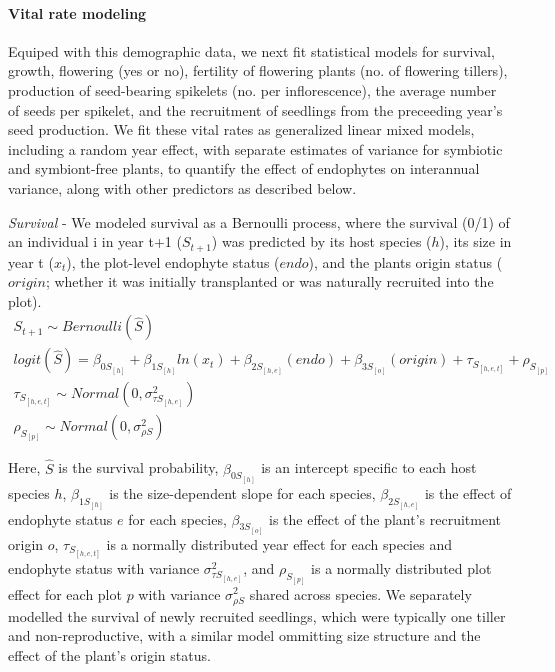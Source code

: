 \documentclass[12pt]{article}
\begin{document}
\paragraph*{Vital rate modeling}
Equiped with this demographic data, we next fit statistical models for survival, growth, flowering (yes or no), fertility of flowering plants (no. of flowering tillers),  production of seed-bearing spikelets (no. per inflorescence), the average number of seeds per spikelet, and the recruitment of seedlings from the preceeding year's seed production.  
We fit these vital rates as generalized linear mixed models, including a random year effect, with separate estimates of variance for symbiotic and symbiont-free plants, to quantify the effect of endophytes on interannual variance, along with other predictors as described below.

\emph{Survival} - We modeled survival as a Bernoulli process, where the survival (0/1) of an individual i in year t+1 ($S_{t+1}$) was predicted by its host species ($h$), its size in year t ($x_t$), the plot-level endophyte status ($endo$), and the plants origin status ($origin$; whether it was initially transplanted or was naturally recruited into the plot).
\begin{subequations} 
	\label{eq:survival}
	\begin{align}
		S_{t+1} \sim Bernoulli(\hat{S}) \\
		logit(\hat{S}) =  \beta_{0S_{[h]}} + \beta_{1S_{[h]}}ln(x_t) + \beta_{2S_{[h,e]}}(endo) + \beta_{3S_{[o]}}(origin) + \tau_{S_{[h,e,t]}} + \rho_{S_{[p]}} \\
		\tau_{S_{[h,e,t]}} \sim Normal(0, \sigma^2_{\tau S_{[h,e]}})\\
		\rho_{S_{[p]}} \sim Normal(0, \sigma^2_{\rho S})
	\end{align}
\end{subequations}

Here, $\hat{S}$ is the survival probability, $\beta_{0S_{[h]}}$ is an intercept specific to each host species $h$, $\beta_{1S_{[h]}}$ is the size-dependent slope for each species, $\beta_{2S_{[h,e]}}$ is the effect of endophyte status $e$ for each species, $\beta_{3S_{[o]}}$ is the effect of the plant's recruitment origin $o$, $\tau_{S_{[h,e,t]}}$ is a normally distributed year effect for each species and endophyte status with variance $\sigma^2_{\tau S_{[h,e]}}$, and $\rho_{S_{[p]}}$ is a normally distributed plot effect for each plot $p$ with variance $\sigma^2_{\rho S}$ shared across species. 
We separately modelled the survival of newly recruited seedlings, which were typically one tiller and non-reproductive, with a similar model ommitting size structure and the effect of the plant's origin status.
\end{document}
